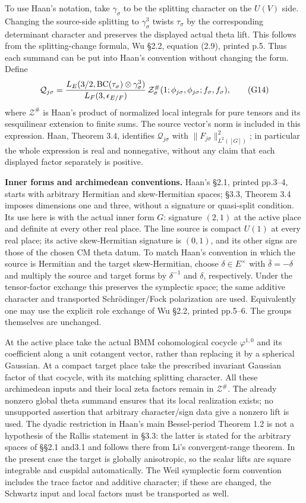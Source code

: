 \documentclass[11pt,a4paper]{article}
\theoremstyle{definition}
\begin{document}
To use Haan's notation, take \(\gamma_\sigma\) to be the splitting character on the \(U(V)\) side. Changing the source-side splitting to \(\gamma_\sigma^3\) twists \(\tau_\sigma\) by the corresponding determinant character and preserves the displayed actual theta lift. This follows from the splitting-change formula, Wu §2.2, equation (2.9), printed p.5. Thus each summand can be put into Haan's convention without changing the form. Define \[
\mathcal Q_{j\sigma}=
{L_E(3/2,\operatorname{BC}(\tau_\sigma)\otimes\gamma_\sigma^3)
 \over L_F(3,\epsilon_{E/F})}
\,\mathcal Z^\#_\sigma(1;\phi_{j\sigma},\phi_{j\sigma};f_\sigma,f_\sigma),
\tag{G14}
\] where \(\mathcal Z^\#\) is Haan's product of normalized local integrals for pure tensors and its sesquilinear extension to finite sums. The source vector's norm is included in this expression. Haan, Theorem 3.4, identifies \(\mathcal Q_{j\sigma}\) with \(\|F_{j\sigma}\|^2_{L^2([G])}\); in particular the whole expression is real and nonnegative, without any claim that each displayed factor separately is positive.

\textbf{Inner forms and archimedean conventions.} Haan's §2.1, printed pp.3--4, starts with arbitrary Hermitian and skew-Hermitian spaces; §3.3, Theorem 3.4 imposes dimensions one and three, without a signature or quasi-split condition. Its use here is with the actual inner form \(G\): signature \((2,1)\) at the active place and definite at every other real place. The line source is compact \(U(1)\) at every real place; its active skew-Hermitian signature is \((0,1)\), and its other signs are those of the chosen CM theta datum. To match Haan's convention in which the source is Hermitian and the target skew-Hermitian, choose \(\delta\in E^\times\) with \(\bar\delta=-\delta\) and multiply the source and target forms by \(\delta^{-1}\) and \(\delta\), respectively. Under the tensor-factor exchange this preserves the symplectic space; the same additive character and transported Schrödinger/Fock polarization are used. Equivalently one may use the explicit role exchange of Wu §2.2, printed pp.5--6. The groups themselves are unchanged.

At the active place take the actual BMM cohomological cocycle \(\varphi^{1,0}\) and its coefficient along a unit cotangent vector, rather than replacing it by a spherical Gaussian. At a compact target place take the prescribed invariant Gaussian factor of that cocycle, with its matching splitting character. All these archimedean inputs and their local zeta factors remain in \(\mathcal Z^\#\). The already nonzero global theta summand ensures that its local realization exists; no unsupported assertion that arbitrary character/sign data give a nonzero lift is used. The dyadic restriction in Haan's main Bessel-period Theorem 1.2 is not a hypothesis of the Rallis statement in §3.3: the latter is stated for the arbitrary spaces of §§2.1 and3.1 and follows there from Li's convergent-range theorem. In the present case the target is globally anisotropic, so the scalar lifts are square integrable and cuspidal automatically. The Weil symplectic form convention includes the trace factor and additive character; if these are changed, the Schwartz input and local factors must be transported as well.
\end{document}
